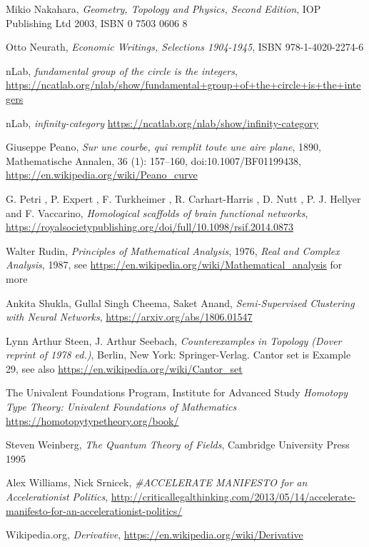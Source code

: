 \documentclass{article}
\begin{document}
\begin{thebibliography}{99}
 Mikio Nakahara, \textit{Geometry, Topology and Physics, Second Edition}, IOP Publishing Ltd 2003, ISBN 0 7503 0606 8

 Otto Neurath, \textit{Economic Writings, Selections 1904-1945}, ISBN 978-1-4020-2274-6

 nLab, \textit{fundamental group of the circle is the integers}, \url{https://ncatlab.org/nlab/show/fundamental+group+of+the+circle+is+the+integers}

 nLab, \textit{infinity-category} \url{https://ncatlab.org/nlab/show/infinity-category}

 Giuseppe Peano, \textit{Sur une courbe, qui remplit toute une aire plane}, 1890, Mathematische Annalen, 36 (1): 157–160, doi:10.1007/BF01199438, \url{https://en.wikipedia.org/wiki/Peano_curve}

 G. Petri , P. Expert , F. Turkheimer , R. Carhart-Harris , D. Nutt , P. J. Hellyer and F. Vaccarino, \textit{Homological scaffolds of brain functional networks}, \url{https://royalsocietypublishing.org/doi/full/10.1098/rsif.2014.0873}

 Walter Rudin, \textit{Principles of Mathematical Analysis}, 1976, \textit{Real and Complex Analysis}, 1987, see \url{https://en.wikipedia.org/wiki/Mathematical_analysis} for more

 Ankita Shukla, Gullal Singh Cheema, Saket Anand, \textit{Semi-Supervised Clustering with Neural Networks}, \url{https://arxiv.org/abs/1806.01547}

 Lynn Arthur Steen, J. Arthur Seebach, \textit{Counterexamples in Topology (Dover reprint of 1978 ed.)}, Berlin, New York: Springer-Verlag. Cantor set is Example 29, see also \url{https://en.wikipedia.org/wiki/Cantor_set}


 The Univalent Foundations Program,
Institute for Advanced Study \textit{Homotopy Type Theory:
Univalent Foundations of Mathematics} \url{https://homotopytypetheory.org/book/}

 Steven Weinberg, \textit{The Quantum Theory of Fields}, Cambridge University Press 1995

 Alex Williams, Nick Srnicek, \textit{\#ACCELERATE MANIFESTO for an Accelerationist Politics}, \url{http://criticallegalthinking.com/2013/05/14/accelerate-manifesto-for-an-accelerationist-politics/}



 Wikipedia.org, \textit{Derivative}, \url{https://en.wikipedia.org/wiki/Derivative}

\end{thebibliography}
\end{document}
